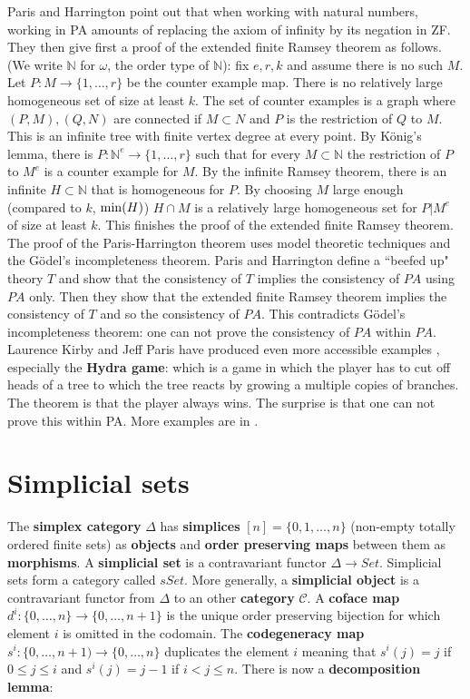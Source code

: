 \documentclass[12pt]{amsart}
\newcounter{example}    \def\example#1{ \item \fontsize{12}{15} \selectfont #1 \fontsize{12}{15} \selectfont }
\begin{document}
Paris and Harrington point out that when working with natural numbers, working in PA
amounts of replacing the axiom of infinity by its negation in ZF. They then give first a proof of the
extended finite Ramsey theorem as follows. (We write $\mathbb{N}$ for $\omega$, the order type of $\mathbb{N}$): 
fix $e,r,k$ and assume there is no such $M$. Let $P:M \to \{1, \dots ,r\}$
be the counter example map. There is no relatively large homogeneous set of size at least $k$.
The set of counter examples is a graph where $(P,M),(Q,N)$ are connected if $M \subset N$ and 
$P$ is the restriction of $Q$ to $M$. This is an infinite tree with finite vertex degree at every point.
By K\"onig's lemma, there is $P: \mathbb{N}^e \to \{1, \dots, r\}$ such that for every $M \subset \mathbb{N}$
the restriction of $P$ to $M^e$ is a counter example for $M$. By the infinite Ramsey theorem, there is an
infinite $H \subset \mathbb{N}$ that is homogeneous for $P$. By choosing $M$ large enough 
(compared to $k$, ${\rm min}(H)$) $H \cap M$ is a relatively large homogeneous set for $P|M^e$ 
of size at least $k$. This finishes the proof of the extended finite Ramsey theorem.
The proof of the Paris-Harrington theorem uses model theoretic techniques and the G\"odel's incompleteness
theorem. Paris and Harrington define a ``beefed up" theory $T$ and show that the consistency of $T$ implies the 
consistency of $PA$ using $PA$ only. Then they show that the extended finite Ramsey theorem implies the
consistency of $T$ and so the consistency of $PA$. This contradicts G\"odel's incompleteness theorem: one can 
not prove the consistency of $PA$ within $PA$.                           
Laurence Kirby and Jeff Paris have produced even more accessible examples \cite{KirbyParis1983}, especially 
the {\bf Hydra game}: which is a game in which the player has to cut off heads of a tree to which the tree
reacts by growing a multiple copies of branches. The theorem is that the player always wins. The surprise
is that one can not prove this within PA. More examples are in \cite{Spencer1983}. 

\section{Simplicial sets}

The {\bf simplex category} $\Delta$ has {\bf simplices} $[n]=\{ 0,1, \dots, n\}$ (non-empty totally ordered finite sets)
as {\bf objects} and {\bf order preserving maps} between them as {\bf morphisms}.
A {\bf simplicial set} is a contravariant functor $\Delta \to Set$. Simplicial sets form a category called $sSet$.
More generally, a {\bf simplicial object} is a contravariant functor from $\Delta$ to an other {\bf category} $\mathcal{C}$.
A {\bf coface map} $d^i: \{0, \dots, n\} \to \{0,\dots,n+1 \}$ is the unique order preserving bijection for which
element $i$ is omitted in the codomain. The {\bf codegeneracy map} $s^i: \{0,\dots,n+1) \to \{0,\dots ,n\}$
duplicates the element $i$ meaning that $s^i(j)=j$ if $0 \leq j \leq i$ and $s^i(j)=j-1$ if $i < j \leq n$.
There is now a {\bf decomposition lemma}:
\end{document}
